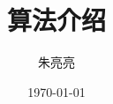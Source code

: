 \documentclass[cn,founder]{simplepaper}
\begin{document}
\title{算法介绍}
\author{朱亮亮}
\date{\today}
\maketitle








\end{document}
